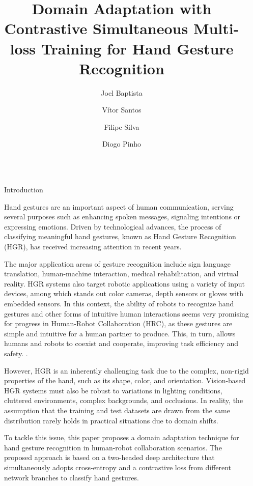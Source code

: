 \documentclass[final]{beamer}
\title{Domain Adaptation with Contrastive Simultaneous Multi-loss
Training for Hand Gesture Recognition}
\author{Joel Baptista \inst{1} \and Vítor Santos \inst{1} \and Filipe Silva \inst{1} \and Diogo Pinho \inst{2}}
\institute[shortinst]{\inst{1} Institute of Electronics and Informatics Engineering of Aveiro (IEETA) \samelineand \\ \inst{2} Bosch Termotecnologia, S. A.  }
\newlength{\sepwidth}
\newlength{\colwidth}
\newcommand{\separatorcolumn}{\begin{column}{\sepwidth}\end{column}}
\begin{document}
\begin{frame}[t]
\begin{columns}[t]
\separatorcolumn

\begin{column}{\colwidth}

  \begin{block}{Introduction}


    Hand gestures are an important aspect of human communication, serving several purposes 
    such as enhancing spoken messages, signaling intentions or expressing emotions. 
    Driven by technological advances, the process of classifying meaningful hand gestures, 
    known as Hand Gesture Recognition (HGR), has received increasing attention in recent years.
    
    The major application areas of gesture recognition include sign language translation, 
    human-machine interaction, medical rehabilitation, and virtual reality. HGR systems also 
    target robotic applications using a variety of input devices, among which stands out color
    cameras, depth sensors or gloves with embedded sensors. In this context, the ability of 
    robots to recognize hand gestures and other forms of intuitive human interactions \cite{afonso2023} 
    seems very promising for progress in Human-Robot Collaboration (HRC), 
    as these gestures are simple and intuitive for a human partner to produce. This, in turn, allows 
    humans and robots to coexist and cooperate, improving task efficiency and safety. \cite{s21124113}.


    However, HGR is an inherently challenging task due to the complex, non-rigid properties of the hand, 
    such as its shape, color, and orientation. Vision-based HGR systems must also be robust to variations 
    in lighting conditions, cluttered environments, complex backgrounds, and occlusions. In reality, the
    assumption that the training and test datasets are drawn from the same distribution rarely holds in
    practical situations due to domain shifts.
    
    To tackle this issue, this paper proposes a domain adaptation technique for hand gesture recognition in 
    human-robot collaboration scenarios. The proposed approach is based on a two-headed 
    deep architecture that simultaneously adopts cross-entropy and a contrastive loss from
    different network branches to classify hand gestures.

  \end{block}


\end{column}
\end{columns}
\end{frame}
\end{document}
